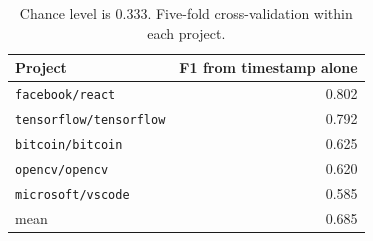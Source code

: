 \begin{table}[htbp]
\centering
\caption{F1 of a classifier given only \texttt{created\_at} and no text.}
\label{tab:timestamp}
\begin{tabular}{lr}
\toprule
Project & F1 from timestamp alone \\
\midrule
\texttt{facebook/react} & 0.802 \\
\texttt{tensorflow/tensorflow} & 0.792 \\
\texttt{bitcoin/bitcoin} & 0.625 \\
\texttt{opencv/opencv} & 0.620 \\
\texttt{microsoft/vscode} & 0.585 \\
\midrule
mean & 0.685 \\
\bottomrule
\end{tabular}
\caption*{\footnotesize Chance level is 0.333. Five-fold cross-validation within each project.}
\end{table}
